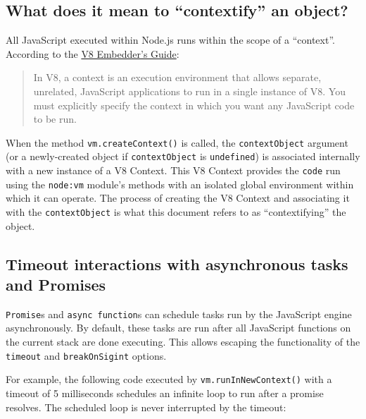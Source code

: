 \subsection{What does it mean to ``contextify'' an
object?}\label{what-does-it-mean-to-contextify-an-object}

All JavaScript executed within Node.js runs within the scope of a
``context''. According to the
\href{https://v8.dev/docs/embed\#contexts}{V8 Embedder's Guide}:

\begin{quote}
In V8, a context is an execution environment that allows separate,
unrelated, JavaScript applications to run in a single instance of V8.
You must explicitly specify the context in which you want any JavaScript
code to be run.
\end{quote}

When the method \texttt{vm.createContext()} is called, the
\texttt{contextObject} argument (or a newly-created object if
\texttt{contextObject} is \texttt{undefined}) is associated internally
with a new instance of a V8 Context. This V8 Context provides the
\texttt{code} run using the \texttt{node:vm} module's methods with an
isolated global environment within which it can operate. The process of
creating the V8 Context and associating it with the
\texttt{contextObject} is what this document refers to as
``contextifying'' the object.

\subsection{Timeout interactions with asynchronous tasks and
Promises}\label{timeout-interactions-with-asynchronous-tasks-and-promises}

\texttt{Promise}s and \texttt{async\ function}s can schedule tasks run
by the JavaScript engine asynchronously. By default, these tasks are run
after all JavaScript functions on the current stack are done executing.
This allows escaping the functionality of the \texttt{timeout} and
\texttt{breakOnSigint} options.

For example, the following code executed by
\texttt{vm.runInNewContext()} with a timeout of 5 milliseconds schedules
an infinite loop to run after a promise resolves. The scheduled loop is
never interrupted by the timeout:

